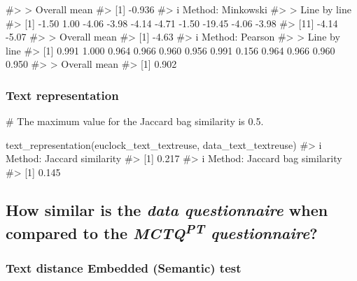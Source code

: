 \documentclass[
  12pt,
  a4paper,
  oneside]{tesesusp}
\newenvironment{Shaded}{\begin{snugshade}}{\end{snugshade}}
\newcommand{\CommentTok}[1]{\textcolor[rgb]{0.37,0.37,0.37}{#1}}
\newcommand{\FunctionTok}[1]{\textcolor[rgb]{0.28,0.35,0.67}{#1}}
\newcommand{\NormalTok}[1]{\textcolor[rgb]{0.00,0.23,0.31}{#1}}
\begin{document}
\begin{Shaded}
\begin{Highlighting}[numbers=left,,]
\CommentTok{\#\textgreater{} \textgreater{} Overall mean}
\CommentTok{\#\textgreater{} [1] {-}0.936}
\CommentTok{\#\textgreater{} i Method: Minkowski}
\CommentTok{\#\textgreater{} \textgreater{} Line by line}
\CommentTok{\#\textgreater{}  [1]  {-}1.50   1.00  {-}4.06  {-}3.98  {-}4.14  {-}4.71  {-}1.50 {-}19.45  {-}4.06  {-}3.98}
\CommentTok{\#\textgreater{} [11]  {-}4.14  {-}5.07}
\CommentTok{\#\textgreater{} \textgreater{} Overall mean}
\CommentTok{\#\textgreater{} [1] {-}4.63}
\CommentTok{\#\textgreater{} i Method: Pearson}
\CommentTok{\#\textgreater{} \textgreater{} Line by line}
\CommentTok{\#\textgreater{}  [1] 0.991 1.000 0.964 0.966 0.960 0.956 0.991 0.156 0.964 0.966 0.960 0.950}
\CommentTok{\#\textgreater{} \textgreater{} Overall mean}
\CommentTok{\#\textgreater{} [1] 0.902}
\end{Highlighting}
\end{Shaded}

\hypertarget{text-representation}{%
\subsubsection{Text representation}\label{text-representation}}

\begin{Shaded}
\begin{Highlighting}[numbers=left,,]
\CommentTok{\# The maximum value for the Jaccard bag similarity is 0.5.}

\FunctionTok{text\_representation}\NormalTok{(euclock\_text\_textreuse, data\_text\_textreuse)}
\CommentTok{\#\textgreater{} i Method: Jaccard similarity}
\CommentTok{\#\textgreater{} [1] 0.217}
\CommentTok{\#\textgreater{} i Method: Jaccard bag similarity}
\CommentTok{\#\textgreater{} [1] 0.145}
\end{Highlighting}
\end{Shaded}

\hypertarget{how-similar-is-the-data-questionnaire-when-compared-to-the-mctqpt-questionnaire}{%
\subsection{\texorpdfstring{How similar is the \emph{data questionnaire}
when compared to the \emph{MCTQ\textsuperscript{PT}
questionnaire}?}{How similar is the data questionnaire when compared to the MCTQPT questionnaire?}}\label{how-similar-is-the-data-questionnaire-when-compared-to-the-mctqpt-questionnaire}}

\hypertarget{text-distance-embedded-semantic-test-1}{%
\subsubsection{Text distance \textbar{} Embedded (Semantic)
test}\label{text-distance-embedded-semantic-test-1}}
\end{document}
